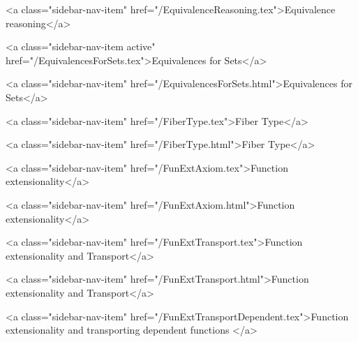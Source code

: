       
        
          <a class="sidebar-nav-item" href="/EquivalenceReasoning.tex">Equivalence reasoning</a>
        
      
    
      
        
          <a class="sidebar-nav-item active" href="/EquivalencesForSets.tex">Equivalences for Sets</a>
        
      
    
      
        
          <a class="sidebar-nav-item" href="/EquivalencesForSets.html">Equivalences for Sets</a>
        
      
    
      
        
          <a class="sidebar-nav-item" href="/FiberType.tex">Fiber Type</a>
        
      
    
      
        
          <a class="sidebar-nav-item" href="/FiberType.html">Fiber Type</a>
        
      
    
      
        
          <a class="sidebar-nav-item" href="/FunExtAxiom.tex">Function extensionality</a>
        
      
    
      
        
          <a class="sidebar-nav-item" href="/FunExtAxiom.html">Function extensionality</a>
        
      
    
      
        
          <a class="sidebar-nav-item" href="/FunExtTransport.tex">Function extensionality and Transport</a>
        
      
    
      
        
          <a class="sidebar-nav-item" href="/FunExtTransport.html">Function extensionality and Transport</a>
        
      
    
      
        
          <a class="sidebar-nav-item" href="/FunExtTransportDependent.tex">Function extensionality and transporting dependent functions </a>
        
      
    
      
        

